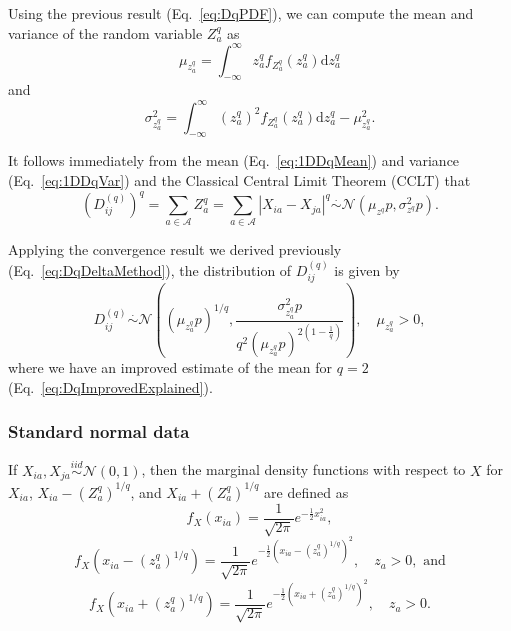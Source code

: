 \documentclass[aoas]{imsart}
\begin{document}
Using the previous result (Eq.~\ref{eq:DqPDF}), we can compute the mean and variance of the random variable $Z^q_a$ as
%
\begin{equation}\label{eq:1DDqMean}
\mu_{z^q_a} = \int_{-\infty}^{\infty} z^q_a f_{Z^q_a}(z^q_a) \text{d}z^q_a
\end{equation}
%
and 
%
\begin{equation}\label{eq:1DDqVar}
\sigma^2_{z^q_a} = \int_{-\infty}^{\infty} \left(z^q_a\right)^2 f_{Z^q_a}(z^q_a) \text{d}z^q_a - \mu^2_{z^q_a}.
\end{equation}

It follows immediately from the mean (Eq.~\ref{eq:1DDqMean}) and variance (Eq.~\ref{eq:1DDqVar}) and the Classical Central Limit Theorem (CCLT) that
%
\begin{equation}\label{eq:DqDistr}
\left(D^{(q)}_{ij}\right)^q = \sum_{a \in \mathcal{A}} Z^q_a = \sum_{a \in \mathcal{A}} |X_{ia} - X_{ja}|^q \overset{.}{\sim} \mathcal{N}\left(\mu_{z^q}p,\sigma^2_{z^q}p\right).
\end{equation}

Applying the convergence result we derived previously (Eq.~\ref{eq:DqDeltaMethod}), the distribution of $D^{(q)}_{ij}$ is given by
%
\begin{equation}\label{eq:DDistr}
D^{(q)}_{ij} \overset{.}{\sim} \mathcal{N}\left(\left(\mu_{z^q_a}p\right)^{1/q},\frac{\sigma^2_{z^q_a}p}{q^2\left(\mu_{z^q_a}p\right)^{2\left(1 - \frac{1}{q}\right)}}\right), \quad \mu_{z^q_a} > 0,
\end{equation}
%
where we have an improved estimate of the mean for $q=2$ (Eq.~\ref{eq:DqImprovedExplained}).

\subsubsection{Standard normal data}

If $X_{ia},X_{ja} \overset{iid}{\sim} \mathcal{N}(0,1)$, then the marginal density functions with respect to $X$ for $X_{ia}$, $X_{ia} - \left(Z^q_a\right)^{1/q}$, and $X_{ia} + \left(Z^q_a\right)^{1/q}$ are defined as
%
\begin{equation}\label{eq:normalXmarg}
f_X(x_{ia}) = \frac{1}{\sqrt{2\pi}}e^{-\frac{1}{2}x^2_{ia}},
\end{equation}
%
\begin{equation}\label{eq:normalXMinusZmarg}
f_X\left(x_{ia} - \left(z^q_a\right)^{1/q}\right) = \frac{1}{\sqrt{2\pi}}e^{-\frac{1}{2}\left(x_{ia} - \left(z^q_a\right)^{1/q}\right)^2}, \quad z_a > 0, \text{ and}
\end{equation}
%
\begin{equation}\label{eq:normalXPlusZmarg}
f_X\left(x_{ia} + \left(z^q_a\right)^{1/q}\right) = \frac{1}{\sqrt{2\pi}}e^{-\frac{1}{2}\left(x_{ia} + \left(z^q_a\right)^{1/q}\right)^2}, \quad z_a > 0.
\end{equation}
\end{document}
